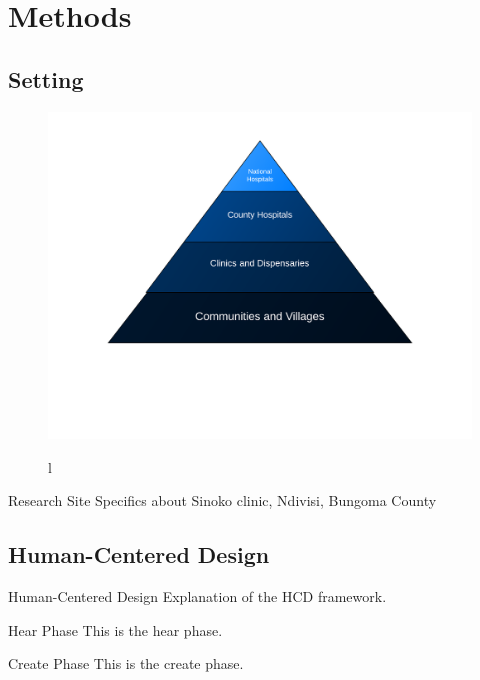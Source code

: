 \documentclass[xcolor=x11names,compress]{beamer}
\renewcommand{\(}{\begin{columns}}
\renewcommand{\)}{\end{columns}}
\newcommand{\<}[1]{\begin{column}{#1}}
\renewcommand{\>}{\end{column}}
\begin{document}
\section{Methods}
\subsection{Setting}
\begin{frame}
\begin{figure}
\centerline{\includegraphics[scale=0.45]{health-system}}l
\end{figure}
\end{frame}

\begin{frame}{Research Site}
Specifics about Sinoko clinic, Ndivisi, Bungoma County
\end{frame}

\subsection{Human-Centered Design}
\begin{frame}{Human-Centered Design}
Explanation of the HCD framework.
\end{frame}

\begin{frame}{Hear Phase}
This is the hear phase.
\end{frame}

\begin{frame}{Create Phase}
This is the create phase.
\end{frame}
\end{document}
